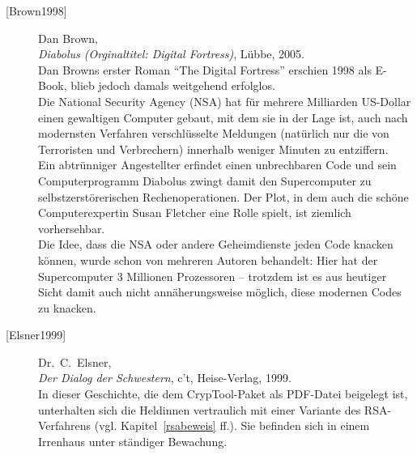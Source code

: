 \begin{refsegment}
\begin{description}
\item[\textrm{[Brown1998]}] 
    Dan Brown, \\
    {\em Diabolus (Orginaltitel: Digital Fortress)}, Lübbe, 2005. \\
    Dan Browns erster Roman "`The Digital Fortress"' erschien 1998 als E-Book,
    blieb jedoch damals weitgehend erfolglos.\\
    Die National Security Agency (NSA) hat für mehrere Milliarden US-Dollar
    einen gewaltigen Computer gebaut, mit dem sie in der Lage ist, auch nach
    modernsten Verfahren verschlüsselte Meldungen (natürlich nur die von
    Terroristen und Verbrechern) innerhalb weniger Minuten zu entziffern.\\
    Ein abtrünniger Angestellter erfindet einen unbrechbaren Code und
    sein Computerprogramm Diabolus zwingt damit den Supercomputer zu
    selbstzerstörerischen Rechenoperationen. Der Plot, in dem auch die
    schöne Computerexpertin Susan Fletcher eine Rolle spielt, ist ziemlich
    vorhersehbar.\\
    Die Idee, dass die NSA oder andere Geheimdienste jeden Code knacken
    können, wurde schon von mehreren Autoren behandelt: Hier hat der
    Supercomputer 3 Millionen Prozessoren -- trotzdem ist es aus heutiger
    Sicht damit auch nicht annäherungsweise möglich, diese modernen Codes
    zu knacken.\\


\item[\textrm{[Elsner1999]}] 
    Dr.~C.~Elsner, \\
    {\em Der Dialog der Schwestern}, c't, Heise-Verlag, 1999. \\
    In dieser Geschichte, die dem CrypTool-Paket als PDF-Datei
    beigelegt ist, unterhalten sich die Heldinnen vertraulich mit einer
    Variante des RSA-Verfahrens (vgl. Kapitel~\ref{rsabeweis} ff.).
    Sie befinden sich in einem Irrenhaus unter ständiger Bewachung.\\



\end{description}
\end{refsegment}
